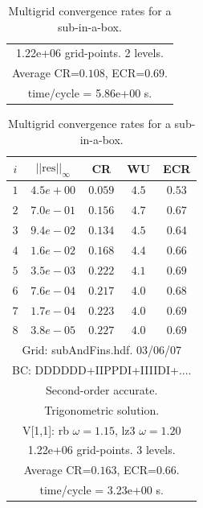 \begin{table}[hbt]
\begin{center}
\begin{tabular}{|c|c|c|c|c|}
\multicolumn{5}{|c|}{1.22e+06 grid-points. 2 levels.}  \\
\multicolumn{5}{|c|}{Average CR=$0.108$, ECR=$0.69$.}  \\
\multicolumn{5}{|c|}{time/cycle = 5.86e+00 s.}  \\
\hline 
\end{tabular}
\qquad
\begin{tabular}{|c|c|c|c|c|} \hline 
 $i$   & $\vert\vert\mbox{res}\vert\vert_\infty$  &  CR     &  WU    & ECR  \\   \hline 
 $ 1$  & $ 4.5e+00$ & $0.059$ & $ 4.5$ & $0.53$ \\ 
 $ 2$  & $ 7.0e-01$ & $0.156$ & $ 4.7$ & $0.67$ \\ 
 $ 3$  & $ 9.4e-02$ & $0.134$ & $ 4.5$ & $0.64$ \\ 
 $ 4$  & $ 1.6e-02$ & $0.168$ & $ 4.4$ & $0.66$ \\ 
 $ 5$  & $ 3.5e-03$ & $0.222$ & $ 4.1$ & $0.69$ \\ 
 $ 6$  & $ 7.6e-04$ & $0.217$ & $ 4.0$ & $0.68$ \\ 
 $ 7$  & $ 1.7e-04$ & $0.223$ & $ 4.0$ & $0.69$ \\ 
 $ 8$  & $ 3.8e-05$ & $0.227$ & $ 4.0$ & $0.69$ \\ 
\hline 
\multicolumn{5}{|c|}{Grid: subAndFins.hdf. 03/06/07}  \\
\multicolumn{5}{|c|}{BC: DDDDDD+IIPPDI+IIIIDI+....}  \\
\multicolumn{5}{|c|}{Second-order accurate.}  \\
\multicolumn{5}{|c|}{Trigonometric solution.}  \\
\multicolumn{5}{|c|}{V[1,1]: rb $\omega=1.15$, lz3 $\omega=1.20$}  \\
\multicolumn{5}{|c|}{1.22e+06 grid-points. 3 levels.}  \\
\multicolumn{5}{|c|}{Average CR=$0.163$, ECR=$0.66$.}  \\
\multicolumn{5}{|c|}{time/cycle = 3.23e+00 s.}  \\
\hline 
\end{tabular}
\end{center}
\caption{Multigrid convergence rates for a sub-in-a-box.}
\label{fig:smoothBox}
\end{table}

